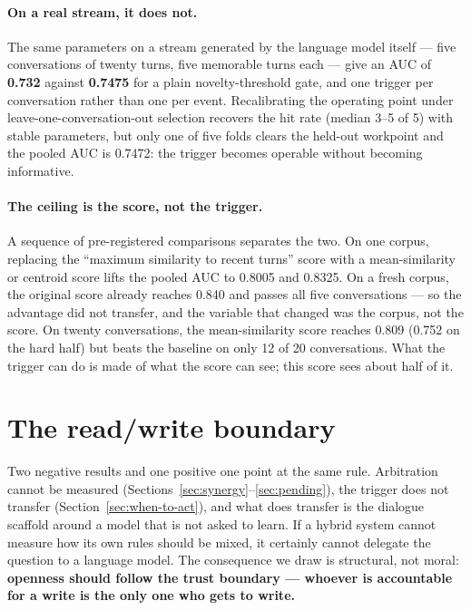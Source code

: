 \documentclass[11pt]{article}
\begin{document}
\paragraph{On a real stream, it does not.} The same parameters on a stream generated
by the language model itself --- five conversations of twenty turns, five memorable
turns each --- give an AUC of \textbf{0.732} against \textbf{0.7475} for a plain
novelty-threshold gate, and one trigger per conversation rather than one per event.
Recalibrating the operating point under leave-one-conversation-out selection
recovers the hit rate (median 3--5 of 5) with stable parameters, but only one of
five folds clears the held-out workpoint and the pooled AUC is 0.7472: the trigger
becomes operable without becoming informative.

\paragraph{The ceiling is the score, not the trigger.} A sequence of pre-registered
comparisons separates the two. On one corpus, replacing the ``maximum similarity to
recent turns'' score with a mean-similarity or centroid score lifts the pooled AUC
to 0.8005 and 0.8325. On a fresh corpus, the original score already reaches 0.840
and passes all five conversations --- so the advantage did not transfer, and the
variable that changed was the corpus, not the score. On twenty conversations, the
mean-similarity score reaches 0.809 (0.752 on the hard half) but beats the baseline
on only 12 of 20 conversations. What the trigger can do is made of what the score
can see; this score sees about half of it.

\section{The read/write boundary}
\label{sec:read-write}

Two negative results and one positive one point at the same rule. Arbitration
cannot be measured (Sections~\ref{sec:synergy}--\ref{sec:pending}), the trigger
does not transfer (Section~\ref{sec:when-to-act}), and what does transfer is the
dialogue scaffold around a model that is not asked to learn. If a hybrid system
cannot measure how its own rules should be mixed, it certainly cannot delegate the
question to a language model. The consequence we draw is structural, not moral:
\textbf{openness should follow the trust boundary --- whoever is accountable for a
write is the only one who gets to write.}
\end{document}
